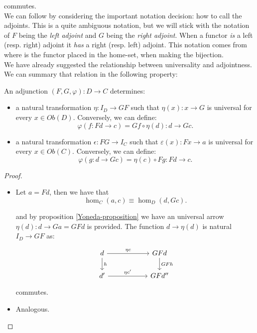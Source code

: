commutes. \\

We can follow by considering the important notation decision: how to call the adjoints. This is a quite ambiguous notation, but we will stick with the notation of $F$ being the \emph{left adjoint} and $G$ being the \emph{right adjoint}. When a functor \emph{is} a left (resp. right) adjoint it \emph{has} a right (resp. left) adjoint. This notation comes from where is the functor placed in the home-set, when making the bijection.\\

We have already suggested the relationship between universality and adjointness. We can summary that relation in the following property:
\begin{proposition}
  An adjunction $(F,G,\varphi): D\to C $ determines:
  \begin{itemize}
  \item a natural transformation $\eta: I_D \to GF$ such that $\eta(x):x\to G$ is universal for every $x\in Ob(D)$. Conversely, we can define:
    $$\varphi(f:Fd\to c) = Gf\circ \eta(d): d\to G c.$$
  \item a natural transformation $\epsilon: FG\to I_C$ such that $\varepsilon(x):Fx\to a$ is universal for every $x\in Ob(C)$. Conversely, we can define:
    $$\varphi(g:d\to Gc) = \eta(c)\circ Fg: Fd\to c.$$
  \end{itemize}
\end{proposition}
\begin{proof}
  \begin{itemize}
  \item Let $a=Fd$, then we have that
    $$\hom_C(a, c)\equiv\hom_D(d, Gc).$$

    and by proposition \ref{Yoneda-proposition} we have an universal arrow $\eta (d):d\to Ga=GFd$ is provided. The function $d\to \eta(d)$ is natural $I_D\to GF$ as:
    \[
  \begin{tikzpicture}
  \node {\begin{tikzcd}[column sep=20mm]
      d\ar[r,"\eta c"]\ar[d,"h"] & GFd\ar[d,"GFh"]\\
      d'\ar[r,"\eta c'"] & GFd''
  \end{tikzcd}};
\end{tikzpicture}
\]
commutes. 
  \item Analogous.
  \end{itemize} 
\end{proof}


